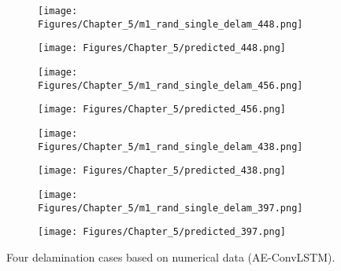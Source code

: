 \begin{figure} [!h]
	\centering
	\begin{subfigure}[b]{.48\textwidth}
		\centering
		\texttt{[image: Figures/Chapter\_5/m1\_rand\_single\_delam\_448.png]}
		\caption{}
		\label{fig:RMS_448}
	\end{subfigure}
	\hfill
	\begin{subfigure}[b]{.48\textwidth}
		\centering
		\texttt{[image: Figures/Chapter\_5/predicted\_448.png]}
		\caption{}
		\label{fig:convlstm_pred_448}	
	\end{subfigure}
	\hfill
	\begin{subfigure}[b]{.48\textwidth}
		\centering
		\texttt{[image: Figures/Chapter\_5/m1\_rand\_single\_delam\_456.png]}
		\caption{}
		\label{fig:RMS_456}
	\end{subfigure}
	\hfill
	\begin{subfigure}[b]{.48\textwidth}
		\centering
		\texttt{[image: Figures/Chapter\_5/predicted\_456.png]}
		\caption{}
		\label{fig:convlstm_pred_456}	
	\end{subfigure}
	\hfill
	\begin{subfigure}[b]{.48\textwidth}
		\centering
		\texttt{[image: Figures/Chapter\_5/m1\_rand\_single\_delam\_438.png]}
		\caption{}
		\label{fig:RMS_438}
	\end{subfigure}
	\hfill
	\begin{subfigure}[b]{.48\textwidth}
		\centering
		\texttt{[image: Figures/Chapter\_5/predicted\_438.png]}
		\caption{}
		\label{fig:convlstm_pred_438}	
	\end{subfigure}
	\hfill
	\begin{subfigure}[b]{.48\textwidth}
		\centering
		\texttt{[image: Figures/Chapter\_5/m1\_rand\_single\_delam\_397.png]}
		\caption{}
		\label{fig:RMS_397}
	\end{subfigure}
	\hfill
	\begin{subfigure}[b]{.48\textwidth}
		\centering
		\texttt{[image: Figures/Chapter\_5/predicted\_397.png]}
		\caption{}
		\label{fig:convlstm_pred_397}	
	\end{subfigure}
	\caption{Four delamination cases based on numerical data (AE-ConvLSTM).}
	\label{fig:Num_convlstm__case}
\end{figure}

